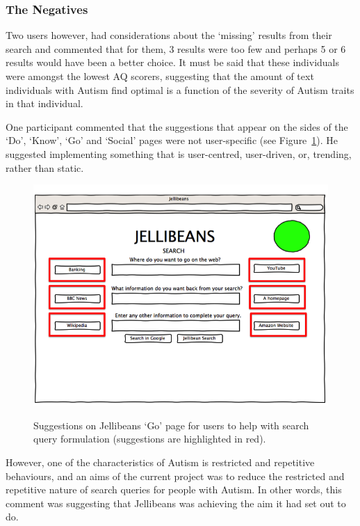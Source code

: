 \documentclass[a4paper, 11pt]{article}
\begin{document}
\subsubsection{The Negatives}

Two users however, had considerations about the `missing' results from their search and commented that for them, 3 results were too few and perhaps 5 or 6 results would have been a better choice. It must be said that these individuals were amongst the lowest AQ scorers, suggesting that the amount of text individuals with Autism find optimal is a function of the severity of Autism traits in that individual.

\vspace{5mm}
One participant commented that the suggestions that appear on the sides of the `Do', `Know', `Go' and `Social' pages were not user-specific (see Figure~\ref{suggestions}). He suggested implementing something that is user-centred, user-driven, or, trending, rather than static.

\begin{figure}[H]
\begin{center}
\includegraphics[scale=0.3]{suggestions}\\
\caption{Suggestions on Jellibeans `Go' page for users to help with search query formulation (suggestions are highlighted in red).}
\label{suggestions}
\end{center}
\end{figure}

However, one of the characteristics of Autism is restricted and repetitive behaviours, and an aims of the current project was to reduce the restricted and repetitive nature of search queries for people with Autism. In other words, this comment was suggesting that Jellibeans was achieving the aim it had set out to do.
\end{document}
